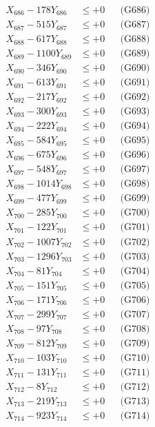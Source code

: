 \documentclass[a4paper,10pt]{article}
\begin{document}
{\begin{align}
X_{686} - 178Y_{686} &\leq +0 && \text{(G686)} \\
X_{687} - 515Y_{687} &\leq +0 && \text{(G687)} \\
X_{688} - 617Y_{688} &\leq +0 && \text{(G688)} \\
X_{689} - 1100Y_{689} &\leq +0 && \text{(G689)} \\
X_{690} - 346Y_{690} &\leq +0 && \text{(G690)} \\
\allowbreak
X_{691} - 613Y_{691} &\leq +0 && \text{(G691)} \\
X_{692} - 217Y_{692} &\leq +0 && \text{(G692)} \\
X_{693} - 300Y_{693} &\leq +0 && \text{(G693)} \\
X_{694} - 222Y_{694} &\leq +0 && \text{(G694)} \\
X_{695} - 584Y_{695} &\leq +0 && \text{(G695)} \\
X_{696} - 675Y_{696} &\leq +0 && \text{(G696)} \\
X_{697} - 548Y_{697} &\leq +0 && \text{(G697)} \\
X_{698} - 1014Y_{698} &\leq +0 && \text{(G698)} \\
X_{699} - 477Y_{699} &\leq +0 && \text{(G699)} \\
X_{700} - 285Y_{700} &\leq +0 && \text{(G700)} \\
\allowbreak
X_{701} - 122Y_{701} &\leq +0 && \text{(G701)} \\
X_{702} - 1007Y_{702} &\leq +0 && \text{(G702)} \\
X_{703} - 1296Y_{703} &\leq +0 && \text{(G703)} \\
X_{704} - 81Y_{704} &\leq +0 && \text{(G704)} \\
X_{705} - 151Y_{705} &\leq +0 && \text{(G705)} \\
X_{706} - 171Y_{706} &\leq +0 && \text{(G706)} \\
X_{707} - 299Y_{707} &\leq +0 && \text{(G707)} \\
X_{708} - 97Y_{708} &\leq +0 && \text{(G708)} \\
X_{709} - 812Y_{709} &\leq +0 && \text{(G709)} \\
X_{710} - 103Y_{710} &\leq +0 && \text{(G710)} \\
\allowbreak
X_{711} - 131Y_{711} &\leq +0 && \text{(G711)} \\
X_{712} - 8Y_{712} &\leq +0 && \text{(G712)} \\
X_{713} - 219Y_{713} &\leq +0 && \text{(G713)} \\
X_{714} - 923Y_{714} &\leq +0 && \text{(G714)} \\

\end{align}}
\end{document}
